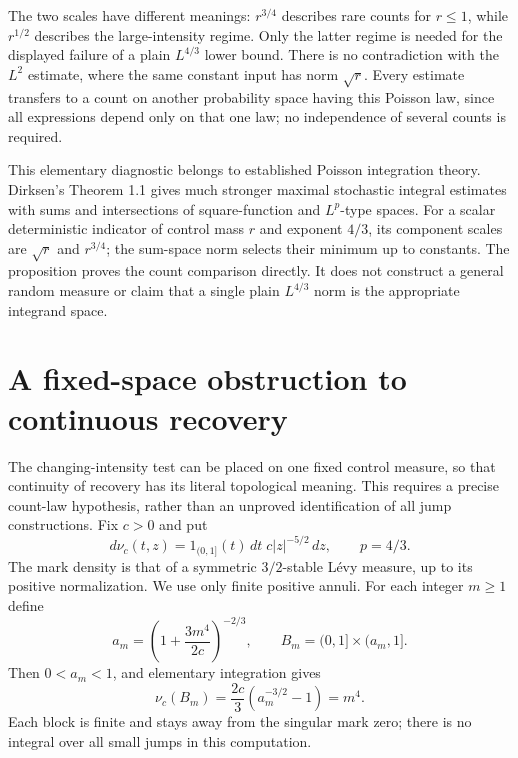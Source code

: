 \documentclass[11pt]{article}
\begin{document}
The two scales have different meanings: $r^{3/4}$ describes rare
counts for $r\leq1$, while $r^{1/2}$ describes the large-intensity
regime. Only the latter regime is needed for the displayed failure of
a plain $L^{4/3}$ lower bound. There is no contradiction with the
$L^2$ estimate, where the same constant input has norm $\sqrt r$.
Every estimate transfers to a count on another probability space
having this Poisson law, since all expressions depend only on that
one law; no independence of several counts is required.

This elementary diagnostic belongs to established Poisson integration
theory. Dirksen's Theorem 1.1 \cite{Dirksen} gives much stronger
maximal stochastic integral estimates with sums and intersections of
square-function and $L^p$-type spaces. For a scalar deterministic
indicator of control mass $r$ and exponent $4/3$, its component
scales are $\sqrt r$ and $r^{3/4}$; the sum-space norm selects their
minimum up to constants. The proposition proves the count comparison
directly. It does not construct a general random measure or claim
that a single plain $L^{4/3}$ norm is the appropriate integrand space.



\section{A fixed-space obstruction to continuous recovery}
The changing-intensity test can be placed on one fixed control measure,
so that continuity of recovery has its literal topological meaning.
This requires a precise count-law hypothesis, rather than an unproved
identification of all jump constructions. Fix $c>0$ and put
\[
 d\nu_c(t,z)=1_{(0,1]}(t)\,dt\;c|z|^{-5/2}\,dz,
 \qquad p=4/3.
\]
The mark density is that of a symmetric $3/2$-stable L\'evy measure,
up to its positive normalization. We use only finite positive annuli.
For each integer $m\geq1$ define
\[
 a_m=\left(1+\frac{3m^4}{2c}\right)^{-2/3},\qquad
 B_m=(0,1]\times(a_m,1].
\]
Then $0<a_m<1$, and elementary integration gives
\begin{equation}\label{eq:stable-block}
 \nu_c(B_m)=\frac{2c}{3}(a_m^{-3/2}-1)=m^4.
\end{equation}
Each block is finite and stays away from the singular mark zero;
there is no integral over all small jumps in this computation.
\end{document}
